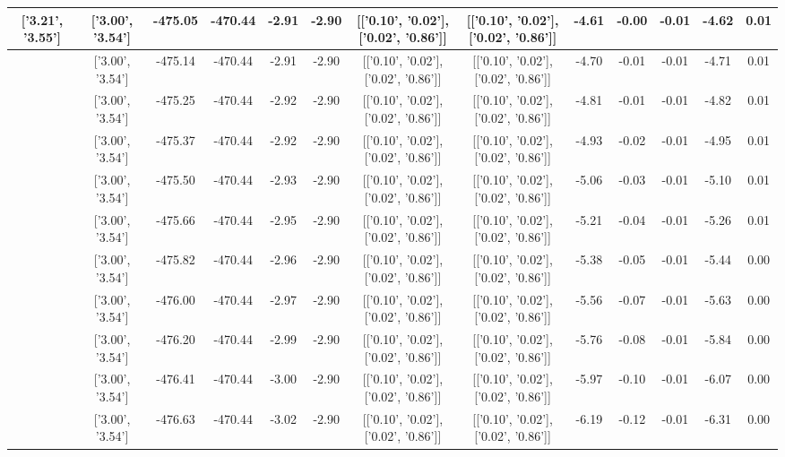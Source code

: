\begin{table}[htbp]
\begin{adjustbox}{angle=90}
\begin{tabular}{|c|c|c|c|c|c|c|c|c|c|c|c|c|}
 ['3.21', '3.55'] & ['3.00', '3.54'] & -475.05 & -470.44 & -2.91 & -2.90 & [['0.10', '0.02'], ['0.02', '0.86']] & [['0.10', '0.02'], ['0.02', '0.86']] & -4.61 & -0.00 & -0.01 & -4.62 & 0.01\\ \hline
 ['3.25', '3.56'] & ['3.00', '3.54'] & -475.14 & -470.44 & -2.91 & -2.90 & [['0.10', '0.02'], ['0.02', '0.86']] & [['0.10', '0.02'], ['0.02', '0.86']] & -4.70 & -0.01 & -0.01 & -4.71 & 0.01\\ \hline
 ['3.29', '3.56'] & ['3.00', '3.54'] & -475.25 & -470.44 & -2.92 & -2.90 & [['0.10', '0.02'], ['0.02', '0.86']] & [['0.10', '0.02'], ['0.02', '0.86']] & -4.81 & -0.01 & -0.01 & -4.82 & 0.01\\ \hline
 ['3.32', '3.56'] & ['3.00', '3.54'] & -475.37 & -470.44 & -2.92 & -2.90 & [['0.10', '0.02'], ['0.02', '0.86']] & [['0.10', '0.02'], ['0.02', '0.86']] & -4.93 & -0.02 & -0.01 & -4.95 & 0.01\\ \hline
 ['3.36', '3.56'] & ['3.00', '3.54'] & -475.50 & -470.44 & -2.93 & -2.90 & [['0.10', '0.02'], ['0.02', '0.86']] & [['0.10', '0.02'], ['0.02', '0.86']] & -5.06 & -0.03 & -0.01 & -5.10 & 0.01\\ \hline
 ['3.40', '3.57'] & ['3.00', '3.54'] & -475.66 & -470.44 & -2.95 & -2.90 & [['0.10', '0.02'], ['0.02', '0.86']] & [['0.10', '0.02'], ['0.02', '0.86']] & -5.21 & -0.04 & -0.01 & -5.26 & 0.01\\ \hline
 ['3.44', '3.57'] & ['3.00', '3.54'] & -475.82 & -470.44 & -2.96 & -2.90 & [['0.10', '0.02'], ['0.02', '0.86']] & [['0.10', '0.02'], ['0.02', '0.86']] & -5.38 & -0.05 & -0.01 & -5.44 & 0.00\\ \hline
 ['3.48', '3.57'] & ['3.00', '3.54'] & -476.00 & -470.44 & -2.97 & -2.90 & [['0.10', '0.02'], ['0.02', '0.86']] & [['0.10', '0.02'], ['0.02', '0.86']] & -5.56 & -0.07 & -0.01 & -5.63 & 0.00\\ \hline
 ['3.51', '3.57'] & ['3.00', '3.54'] & -476.20 & -470.44 & -2.99 & -2.90 & [['0.10', '0.02'], ['0.02', '0.86']] & [['0.10', '0.02'], ['0.02', '0.86']] & -5.76 & -0.08 & -0.01 & -5.84 & 0.00\\ \hline
 ['3.55', '3.58'] & ['3.00', '3.54'] & -476.41 & -470.44 & -3.00 & -2.90 & [['0.10', '0.02'], ['0.02', '0.86']] & [['0.10', '0.02'], ['0.02', '0.86']] & -5.97 & -0.10 & -0.01 & -6.07 & 0.00\\ \hline
 ['3.59', '3.58'] & ['3.00', '3.54'] & -476.63 & -470.44 & -3.02 & -2.90 & [['0.10', '0.02'], ['0.02', '0.86']] & [['0.10', '0.02'], ['0.02', '0.86']] & -6.19 & -0.12 & -0.01 & -6.31 & 0.00\\ \hline

\end{tabular}
\end{adjustbox}
\end{table}
